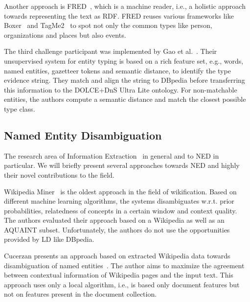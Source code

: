 Another approach is FRED~\cite{fred_typing}, which is a machine reader, i.e., a holistic approach towards representing  the text as \ac{RDF}. 
FRED reuses various frameworks like Boxer~\citep{Bos:2008:WSA:1626481.1626503} and TagMe2~\cite{TagMe2} to spot not only the common types like person, organizations and places but also events.

The third challenge participant was implemented by Gao et al.~\cite{oak_sheffield}. 
Their unsupervised system for entity typing is based on a rich feature set, e.g., words, named entities, gazetteer tokens and semantic distance, to identify the type evidence string. 
They match and align the string to DBpedia before transferring this information to the DOLCE+DnS Ultra Lite ontology.
For non-matchable entities, the authors compute a semantic distance and match the closest possible type class.  




\subsection{Named Entity Disambiguation}

The research area of Information Extraction~\cite{nad:sek} in general and to \ac{NED} in particular.
We will briefly present several approaches towards \ac{NED} and highly their novel contributions to the field.


\bigskip

Wikipedia Miner~\cite{milne2008learning} is the oldest approach in the field of {wikification}.
Based on different machine learning algorithms, the systems disambiguates w.r.t. prior probabilities, relatedness of concepts in a certain window and context quality. 
The authors evaluated their approach based on a Wikipedia as well as an AQUAINT subset. 
Unfortunately, the authors do not use the opportunities provided by \ac{LD} like DBpedia.

Cucerzan presents an approach based on extracted Wikipedia data towards disambiguation of named entities~\cite{Cucerzan07}.
The author aims to maximize the agreement between contextual information of Wikipedia pages and the input text.
This approach uses only a local algorithm, i.e., is based only document features but not on features present in the document collection.

